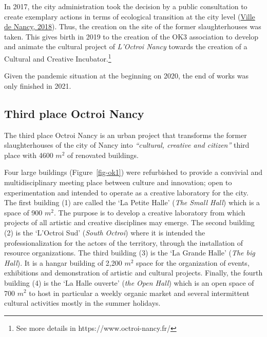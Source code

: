 \documentclass[
  11pt,
]{article}
\begin{document}
In 2017, the city administration took the decision by a public
consultation to create exemplary actions in terms of ecological
transition at the city level
(\protect\hyperlink{ref-villedenancy2018}{Ville de Nancy, 2018}). Thus,
the creation on the site of the former slaughterhouses was taken. This
gives birth in 2019 to the creation of the OK3 association to develop
and animate the cultural project of \emph{L'Octroi Nancy} towards the
creation of a Cultural and Creative Incubator.\footnote{See more details
  in https://www.octroi-nancy.fr/}

Given the pandemic situation at the beginning on 2020, the end of works
was only finished in 2021.

\hypertarget{third-place-octroi-nancy}{%
\subsection{Third place Octroi Nancy}\label{third-place-octroi-nancy}}

The third place Octroi Nancy is an urban project that transforms the
former slaughterhouses of the city of Nancy into \emph{``cultural,
creative and citizen''} third place with 4600 \(m^2\) of renovated
buildings.

Four large buildings (Figure~\ref{fig-ok1}) were refurbished to provide
a convivial and multidisciplinary meeting place between culture and
innovation; open to experimentation and intended to operate as a
creative laboratory for the city. The first building (1) are called the
`La Petite Halle' (\emph{The Small Hall}) which is a space of 900
\(m^2\). The purpose is to develop a creative laboratory from which
projects of all artistic and creative disciplines may emerge. The second
building (2) is the `L'Octroi Sud' (\emph{South Octroi}) where it is
intended the professionalization for the actors of the territory,
through the installation of resource organizations. The third building
(3) is the `La Grande Halle' (\emph{The big Hall}). It is a hangar
building of 2,200 \(m^2\) space for the organization of events,
exhibitions and demonstration of artistic and cultural projects.
Finally, the fourth building (4) is the `La Halle ouverte' (\emph{the
Open Hall}) which is an open space of 700 \(m^2\) to host in particular
a weekly organic market and several intermittent cultural activities
mostly in the summer holidays.
\end{document}
